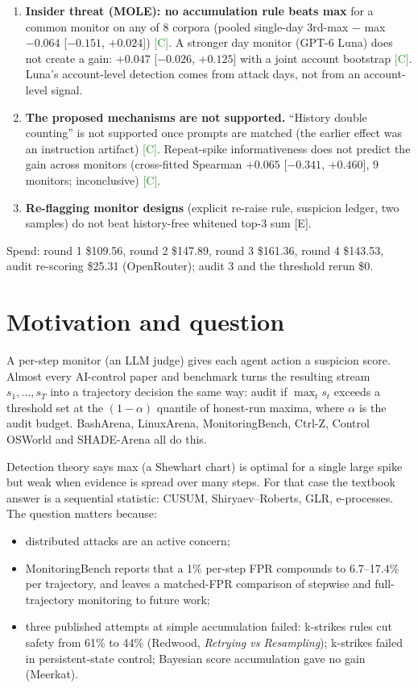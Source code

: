 \documentclass[11pt]{article}
\newcommand{\m}{\ensuremath{-}}
\newcommand{\tC}{\textsf{\scriptsize\textcolor{ForestGreen}{[C]}}\xspace}
\newcommand{\tE}{\textsf{\scriptsize\textcolor{ink2}{[E]}}\xspace}
\begin{document}
{\begin{enumerate}[leftmargin=1.2em]
\item \textbf{Insider threat (MOLE): no accumulation rule beats max} for a common monitor on any of 8 corpora (pooled single-day 3rd-max $-$ max $\m0.064$ [$\m0.151$, $+0.024$]) \tC. A stronger day monitor (GPT-6 Luna) does not create a gain: $+0.047$ [$\m0.026$, $+0.125$] with a joint account bootstrap \tC. Luna's account-level detection comes from attack days, not from an account-level signal.
\item \textbf{The proposed mechanisms are not supported.} ``History double counting'' is not supported once prompts are matched (the earlier effect was an instruction artifact) \tC. Repeat-spike informativeness does not predict the gain across monitors (cross-fitted Spearman $+0.065$ [$\m0.341$, $+0.460]$, 9 monitors; inconclusive) \tC.
\item \textbf{Re-flagging monitor designs} (explicit re-raise rule, suspicion ledger, two samples) do not beat history-free whitened top-3 sum \tE.
\end{enumerate}
Spend: round 1 \$109.56, round 2 \$147.89, round 3 \$161.36, round 4 \$143.53, audit re-scoring \$25.31 (OpenRouter); audit 3 and the threshold rerun \$0.}

\clearpage
\setcounter{tocdepth}{1}
\tableofcontents

\section{Motivation and question}

A per-step monitor (an LLM judge) gives each agent action a suspicion score. Almost every AI-control paper and benchmark turns the resulting stream $s_1,\dots,s_T$ into a trajectory decision the same way: audit if $\max_t s_t$ exceeds a threshold set at the $(1-\alpha)$ quantile of honest-run maxima, where $\alpha$ is the audit budget. BashArena, LinuxArena, MonitoringBench, Ctrl-Z, Control OSWorld and SHADE-Arena all do this.

Detection theory says max (a Shewhart chart) is optimal for a single large spike but weak when evidence is spread over many steps. For that case the textbook answer is a sequential statistic: CUSUM, Shiryaev--Roberts, GLR, e-processes. The question matters because:
\begin{itemize}
\item distributed attacks are an active concern;
\item MonitoringBench reports that a 1\% per-step FPR compounds to 6.7--17.4\% per trajectory, and leaves a matched-FPR comparison of stepwise and full-trajectory monitoring to future work;
\item three published attempts at simple accumulation failed: k-strikes rules cut safety from 61\% to 44\% (Redwood, \emph{Retrying vs Resampling}); k-strikes failed in persistent-state control; Bayesian score accumulation gave no gain (Meerkat).
\end{itemize}
\end{document}

